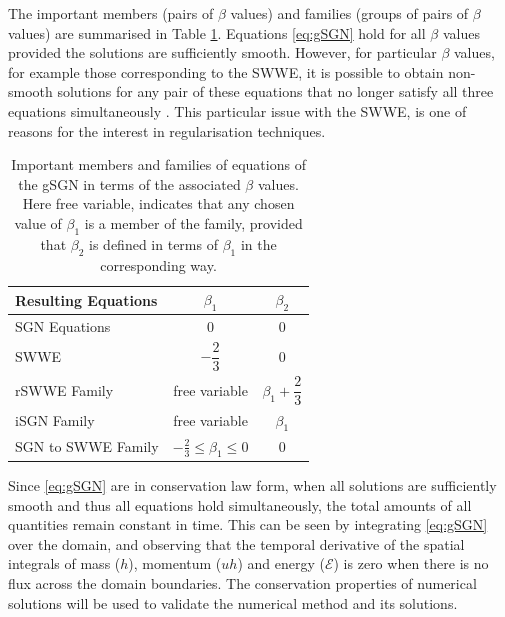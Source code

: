 \documentclass[10pt]{elsarticle}
\newcommand\T{\rule{0pt}{3ex }}       %
\begin{document}
The important members (pairs of $\beta$ values) and families (groups of pairs of $\beta$ values) are summarised in Table \ref{Tab:gSGNFamilyMembers}. Equations \eqref{eq:gSGN} hold for all $\beta$ values provided the solutions are sufficiently smooth. However, for particular $\beta$ values, for example those corresponding to the SWWE, it is possible to obtain non-smooth solutions for any pair of these equations that no longer satisfy all three equations simultaneously \cite{Pu-2018-1361}. This particular issue with the SWWE, is one of reasons for the interest in regularisation techniques. 
\begin{table}
	\centering
	\begin{tabular}{l | c | c}
		Resulting Equations &$\beta_1$ & $\beta_2$  \\
		\hline 
		\T SGN Equations & $0$ & $0$ \\
		\T SWWE & $-\dfrac{2}{3}$ & $0$ \\
		\T rSWWE Family & free variable & $\beta_1 + \dfrac{2}{3}$  \\
		\T iSGN Family & free variable & $\beta_1$ \\
		\T SGN to SWWE Family & $ -\frac{2}{3}\le\beta_1 \le 0$ & $0$
	\end{tabular}
	\caption{Important members and families of equations of the gSGN in terms of the associated $\beta$ values. Here free variable, indicates that any chosen value of $\beta_1$ is a member of the family, provided that $\beta_2$ is defined in terms of $\beta_1$ in the corresponding way.}
	\label{Tab:gSGNFamilyMembers}
\end{table}

Since \eqref{eq:gSGN} are in conservation law form, when all solutions are sufficiently smooth and thus all equations hold simultaneously, the total amounts of all quantities remain constant in time. This can be seen by integrating \eqref{eq:gSGN} over the domain, and observing that the temporal derivative of the spatial integrals of mass ($h$), momentum ($uh$) and energy ($\mathcal{E}$) is zero when there is no flux across the domain boundaries. The conservation properties of numerical solutions will be used to validate the numerical method and its solutions. 
\end{document}
